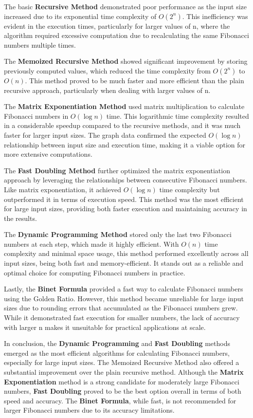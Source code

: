 \documentclass[a4paper,12pt]{article}
\begin{document}
The basic \textbf{\textbf{Recursive Method}} demonstrated poor performance as the input size increased due to its exponential time complexity of \(O(2^n)\). This inefficiency was evident in the execution times, particularly for larger values of n, where the algorithm required excessive computation due to recalculating the same Fibonacci numbers multiple times.

The \textbf{\textbf{Memoized Recursive Method}} showed significant improvement by storing previously computed values, which reduced the time complexity from \(O(2^n)\) to \(O(n)\). This method proved to be much faster and more efficient than the plain recursive approach, particularly when dealing with larger values of n.

The \textbf{\textbf{Matrix Exponentiation Method}} used matrix multiplication to calculate Fibonacci numbers in \(O(\log n)\) time. This logarithmic time complexity resulted in a considerable speedup compared to the recursive methods, and it was much faster for larger input sizes. The graph data confirmed the expected \(O(\log n)\) relationship between input size and execution time, making it a viable option for more extensive computations.

The \textbf{\textbf{Fast Doubling Method}} further optimized the matrix exponentiation approach by leveraging the relationships between consecutive Fibonacci numbers. Like matrix exponentiation, it achieved \(O(\log n)\) time complexity but outperformed it in terms of execution speed. This method was the most efficient for large input sizes, providing both faster execution and maintaining accuracy in the results.

The \textbf{\textbf{Dynamic Programming Method}} stored only the last two Fibonacci numbers at each step, which made it highly efficient. With \(O(n)\) time complexity and minimal space usage, this method performed excellently across all input sizes, being both fast and memory-efficient. It stands out as a reliable and optimal choice for computing Fibonacci numbers in practice.

Lastly, the \textbf{\textbf{Binet Formula}} provided a fast way to calculate Fibonacci numbers using the Golden Ratio. However, this method became unreliable for large input sizes due to rounding errors that accumulated as the Fibonacci numbers grew. While it demonstrated fast execution for smaller numbers, the lack of accuracy with larger n makes it unsuitable for practical applications at scale.

In conclusion, the \textbf{\textbf{Dynamic Programming}} and \textbf{\textbf{Fast Doubling}} methods emerged as the most efficient algorithms for calculating Fibonacci numbers, especially for large input sizes. The Memoized Recursive Method also offered a substantial improvement over the plain recursive method. Although the \textbf{\textbf{Matrix Exponentiation}} method is a strong candidate for moderately large Fibonacci numbers, \textbf{\textbf{Fast Doubling}} proved to be the best option overall in terms of both speed and accuracy. The \textbf{\textbf{Binet Formula}}, while fast, is not recommended for larger Fibonacci numbers due to its accuracy limitations.
\end{document}
